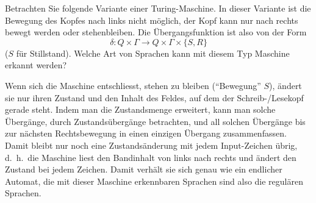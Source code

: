 Betrachten Sie folgende Variante einer Turing-Maschine. In dieser
Variante ist die Bewegung des Kopfes nach links nicht möglich,
der Kopf kann nur nach rechts bewegt werden oder stehenbleiben. Die
Übergangsfunktion ist also von der Form
$$\delta:Q\times \Gamma\to Q\times\Gamma\times \{S,R\}$$
($S$ für Stillstand). Welche Art von Sprachen kann mit diesem
Typ Maschine erkannt werden?


\begin{loesung}
Wenn sich die Maschine entschliesst, stehen zu bleiben (``Bewegung'' $S$),
ändert sie
nur ihren Zustand und den Inhalt des Feldes, auf dem der Schreib-/Lesekopf
gerade steht. Indem man die Zustandsmenge erweitert, kann man solche
Übergänge, durch Zustandsübergänge betrachten, und all solchen Übergänge
bis zur nächsten Rechtsbewegung in einen einzigen Übergang zusammenfassen.
Damit bleibt nur noch eine Zustandsänderung mit jedem Input-Zeichen
übrig, d.~h.~die Maschine liest den Bandinhalt von links nach rechts und
ändert den Zustand bei jedem Zeichen. Damit verhält sie sich genau
wie ein endlicher Automat, die mit dieser Maschine erkennbaren Sprachen
sind also die regulären Sprachen.
\end{loesung}
